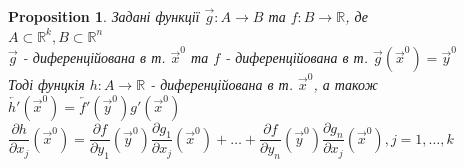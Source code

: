 \documentclass[a4paper, 14pt]{extarticle}
\theoremstyle{theoremdd}
\theoremstyle{theoremdd}
\theoremstyle{theoremdd}
\theoremstyle{theoremdd}
\theoremstyle{theoremdd}
\newtheorem{proposition}[theorem]{Proposition}
\theoremstyle{theoremdd}
\theoremstyle{theoremdd}
\theoremstyle{theoremdd}
\begin{document}
\begin{proposition}
Задані функції $\vec{g}: A \to B$ та $f: B \to \mathbb{R}$, де \\ $A \subset \mathbb{R}^k, B \subset \mathbb{R}^n$\\
$\vec{g}$ - диференційована в т. $\vec{x}^0$ та $f$ - диференційована в т. $\vec{g}(\vec{x}^0) = \vec{y}^0$\\
Тоді фунцкія $h: A \to \mathbb{R}$ - диференційована в т. $\vec{x}^0$, а також\\
$\overleftarrow{h'}(\vec{x}^0) = \overleftarrow{f'}(\vec{y}^0) g'(\vec{x}^0)$\\
$\dfrac{\partial h}{\partial x_j}(\vec{x}^0) = \dfrac{\partial f}{\partial y_1}(\vec{y}^0) \dfrac{\partial g_1}{\partial x_j}(\vec{x}^0) + \dots + \dfrac{\partial f}{\partial y_n}(\vec{y}^0) \dfrac{\partial g_n}{\partial x_j}(\vec{x}^0), j = 1,\dots,k$
\end{proposition}
\end{document}
